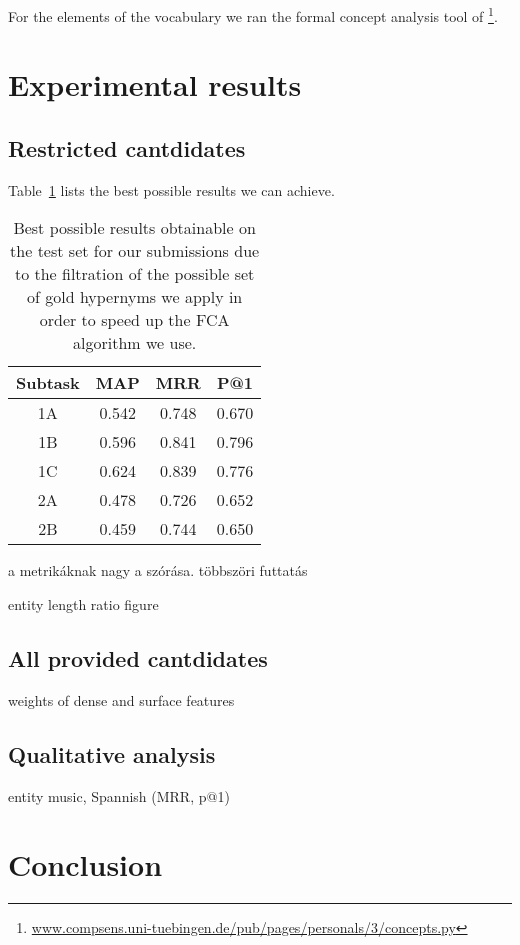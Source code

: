 \documentclass[11pt,a4paper]{article}
\begin{document}
For the elements of the vocabulary we ran the formal concept analysis tool of
\citet{Endres:2010}\footnote{\url{www.compsens.uni-tuebingen.de/pub/pages/personals/3/concepts.py}}.


\section{Experimental results}

\subsection{Restricted cantdidates}

Table~\ref{table:upper} lists the best possible results we can achieve.

\begin{table}
	\centering
	\begin{tabular}{c|ccc}
		Subtask & MAP & MRR & P@1 \\ \hline
		1A & 0.542 & 0.748 & 0.670 \\
		1B & 0.596 & 0.841 & 0.796 \\
		1C & 0.624 & 0.839 & 0.776 \\
		2A & 0.478 & 0.726 & 0.652 \\
		2B & 0.459 & 0.744 & 0.650 \\
	\end{tabular}
	\label{table:upper}
	\caption{Best possible results obtainable on the test set for our
submissions due to the filtration of the possible set of gold hypernyms
we apply in order to speed up the FCA algorithm we use.}
\end{table}

a metrikáknak nagy a szórása. többszöri futtatás %

entity length ratio figure %

\subsection{All provided cantdidates}

weights of dense and surface features %

\subsection{Qualitative analysis} %

entity music, Spannish (MRR, p@1)

\section{Conclusion}



\end{document}
